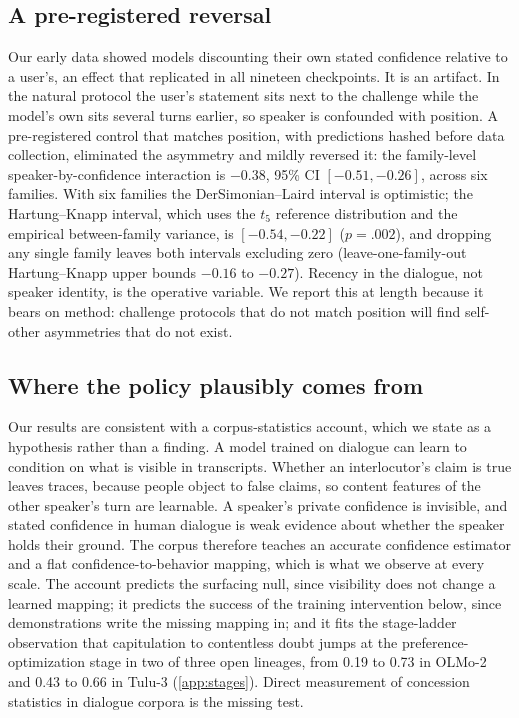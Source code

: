 \documentclass{article}
\begin{document}
\subsection{A pre-registered reversal}
\label{sec:reversal}

Our early data showed models discounting their own stated confidence relative to a user's, an effect that replicated in all nineteen checkpoints. It is an artifact. In the natural protocol the user's statement sits next to the challenge while the model's own sits several turns earlier, so speaker is confounded with position. A pre-registered control that matches position, with predictions hashed before data collection, eliminated the asymmetry and mildly reversed it: the family-level speaker-by-confidence interaction is $-0.38$, 95\% CI $[-0.51, -0.26]$, across six families. With six families the DerSimonian--Laird interval is optimistic; the Hartung--Knapp interval, which uses the $t_{5}$ reference distribution and the empirical between-family variance, is $[-0.54,-0.22]$ ($p=.002$), and dropping any single family leaves both intervals excluding zero (leave-one-family-out Hartung--Knapp upper bounds $-0.16$ to $-0.27$). Recency in the dialogue, not speaker identity, is the operative variable. We report this at length because it bears on method: challenge protocols that do not match position will find self-other asymmetries that do not exist.

\subsection{Where the policy plausibly comes from}
\label{sec:origin}

Our results are consistent with a corpus-statistics account, which we state as a hypothesis rather than a finding. A model trained on dialogue can learn to condition on what is visible in transcripts. Whether an interlocutor's claim is true leaves traces, because people object to false claims, so content features of the other speaker's turn are learnable. A speaker's private confidence is invisible, and stated confidence in human dialogue is weak evidence about whether the speaker holds their ground. The corpus therefore teaches an accurate confidence estimator and a flat confidence-to-behavior mapping, which is what we observe at every scale. The account predicts the surfacing null, since visibility does not change a learned mapping; it predicts the success of the training intervention below, since demonstrations write the missing mapping in; and it fits the stage-ladder observation that capitulation to contentless doubt jumps at the preference-optimization stage in two of three open lineages, from 0.19 to 0.73 in OLMo-2 and 0.43 to 0.66 in Tulu-3 (\cref{app:stages}). Direct measurement of concession statistics in dialogue corpora is the missing test.
\end{document}
